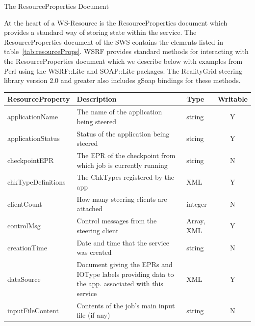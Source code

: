 \documentclass[a4paper]{article}
\begin{document}
\begin{section}{The ResourceProperties Document}
\label{sec:RPDoc}

At the heart of a WS-Resource is the ResourceProperties document which
provides a standard way of storing state within the service.  The
ResourceProperties document of the SWS contains the elements listed in
table~\ref{tab:resourceProps}.  WSRF provides standard methods for
interacting with the ResourceProperties document which we describe
below with examples from Perl using the WSRF::Lite and SOAP::Lite
packages.  The RealityGrid steering library version 2.0 and greater
also includes gSoap bindings for these methods.

\begin{table}
\begin{center}
\begin{tabular}{l|p{6cm}|l|c}
\hline\hline
ResourceProperty   & Description & Type & Writable\\
\hline
applicationName    & The name of the application being steered & string & Y\\
applicationStatus  & Status of the application being steered & string & Y\\
checkpointEPR      & The EPR of the checkpoint from which job is currently running & string & N\\
chkTypeDefinitions & The ChkTypes registered by the app & XML & Y\\
clientCount        & How many steering clients are attached & integer & N\\
controlMsg         & Control messages from the steering client & Array, XML & Y\\
creationTime       & Date and time that the service was created & string & N\\
dataSource         & Document giving the EPRs and IOType labels providing data to the app. associated with this service & XML & Y\\ 
inputFileContent   & Contents of the job's main input file (if any) & string & N\\


\end{tabular}
\end{center}
\end{table}
\end{section}
\end{document}
